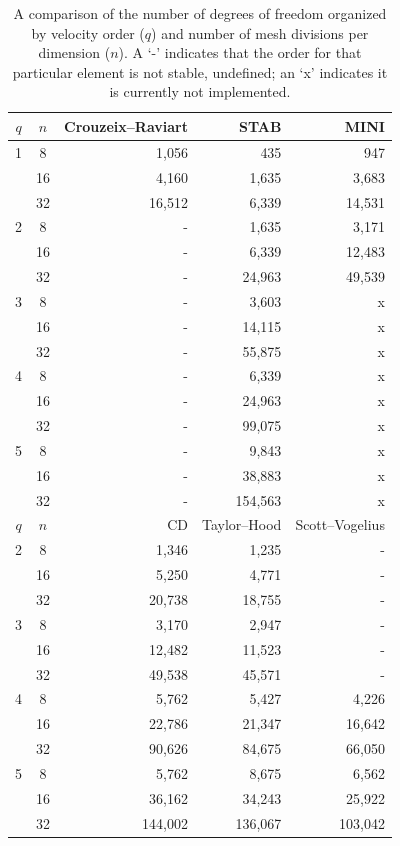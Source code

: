 \begin{table}
  \center
  \medskip
  \small
  \begin{tabular}{|cc|rrr|}
    \hline
    $q$ & $n$ & Crouzeix--Raviart & STAB & MINI \\
    \hline
    1&  8 &   1,056 &   435 & 947  \\
      & 16 &   4,160 & 1,635 & 3,683 \\
      & 32 & 16,512 & 6,339 & 14,531 \\
    \hline
    2 &  8 & - &     1,635 & 3,171 \\
       & 16 & - &    6,339 &  12,483 \\
       & 32 & - &  24,963 & 49,539 \\
    \hline
    3 &  8 & - &    3,603 & x \\
       & 16 & - & 14,115 & x \\
       & 32 & - & 55,875 & x \\
    \hline
    4 &  8 & - &    6,339 & x \\
       & 16 & - & 24,963 & x \\
       & 32 & - & 99,075 & x \\
    \hline
    5 &  8 & - &      9,843 &  x \\
       & 16 & - &   38,883 &  x \\
       & 32 & - & 154,563 & x \\
    \hline
    \hline
    $q$ & $n$ & CD & Taylor--Hood & Scott--Vogelius \\
    \hline
    2 &  8 &  1,346 &   1,235 & - \\
       & 16 &  5,250 &   4,771 & - \\
       & 32 & 20,738& 18,755 & - \\
    \hline
    3 &  8 &   3,170 &   2,947 & - \\
       & 16 & 12,482 & 11,523 & - \\
       & 32 & 49,538 & 45,571 & - \\
    \hline
    4 &  8 &   5,762 &    5,427 &   4,226 \\
       & 16 & 22,786 &  21,347 & 16,642 \\
       & 32 & 90,626 &  84,675 & 66,050 \\
    \hline
    5 &  8 &      5,762 &     8,675 &     6,562 \\
       & 16 &   36,162 &   34,243 &   25,922 \\
       & 32 & 144,002 & 136,067 & 103,042 \\
    \hline
\end{tabular}
  \caption{A comparison of the number of degrees of freedom organized
  by velocity order ($q$) and number of mesh divisions per dimension
  ($n$). A `-' indicates that the order for that particular element is
  not stable, undefined; an `x' indicates it is currently not
  implemented.}  \label{tab:terrel:DOFs}
\end{table}

